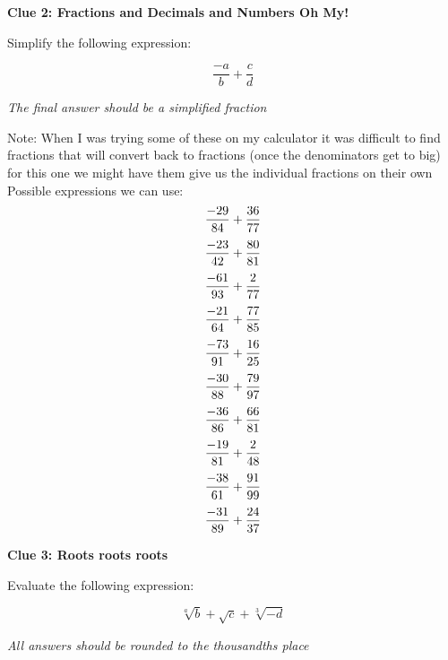 \documentclass[11pt]{scrartcl}
\theoremstyle{definition}
\begin{document}
\newpage

\begin{center}
	\textbf{Clue 2: Fractions and Decimals and Numbers Oh My!}
\end{center}

\noindent
Simplify the following expression:

\vspace{1cm}

\[ \frac{-a}{b}+\frac{c}{d} \]

\vspace{2cm}

\noindent
\textit{The final answer should be a simplified fraction}

\vspace{3cm}
\noindent
Note: When I was trying some of these on my calculator it was difficult to find fractions that will convert back to fractions (once the denominators get to big) for this one we might have them give us the individual fractions on their own\\
Possible expressions we can use:
\[ \frac{-29}{84}+\frac{36}{77}\\[4mm] \]
\[ \frac{-23}{42}+\frac{80}{81}\\[4mm] \]
\[ \frac{-61}{93}+\frac{2}{77}\\[4mm] \]
\[ \frac{-21}{64}+\frac{77}{85}\\[4mm] \]
\[ \frac{-73}{91}+\frac{16}{25}\\[4mm] \]
\[ \frac{-30}{88}+\frac{79}{97}\\[4mm] \]
\[ \frac{-36}{86}+\frac{66}{81}\\[4mm] \]
\[ \frac{-19}{81}+\frac{2}{48}\\[4mm] \]
\[ \frac{-38}{61}+\frac{91}{99}\\[4mm] \]
\[ \frac{-31}{89}+\frac{24}{37}\\[4mm] \]

\newpage

\begin{center}
	\textbf{Clue 3: Roots roots roots}	
\end{center}

\noindent
Evaluate the following expression:

\vspace{1cm}

\[ \sqrt[a]{b} + \sqrt{c} + \sqrt[3]{-d}\]

\vspace{2cm}

\noindent
\textit{All answers should be rounded to the thousandths place}
\end{document}

